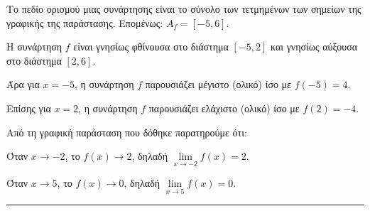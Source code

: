 \begin{alist}
\item Το πεδίο ορισμού μιας συνάρτησης είναι το σύνολο των τετμημένων των σημείων της γραφικής της παράστασης. Επομένως: $A_f = [-5,6]$.

\item Η συνάρτηση $f$ είναι γνησίως φθίνουσα στο διάστημα $[-5,2]$ και γνησίως αύξουσα στο διάστημα $[2,6]$.

Άρα για $x = -5$, η συνάρτηση $f$ παρουσιάζει μέγιστο (ολικό) ίσο με $f(-5) = 4$.

Επίσης για $x = 2$, η συνάρτηση $f$ παρουσιάζει ελάχιστο (ολικό) ίσο με $f(2) = -4$.

\item Από τη γραφική παράσταση που δόθηκε παρατηρούμε ότι:

Όταν $x \to -2$, το $f(x) \to 2$, δηλαδή $\lim\limits_{x \to -2} f(x) = 2$.

Όταν $x \to 5$, το $f(x) \to 0$, δηλαδή $\lim\limits_{x \to 5} f(x) = 0$.
\end{alist}
\vspace{6mm}
\noindent\rule{\textwidth}{0.4pt}
\vspace{6mm}

